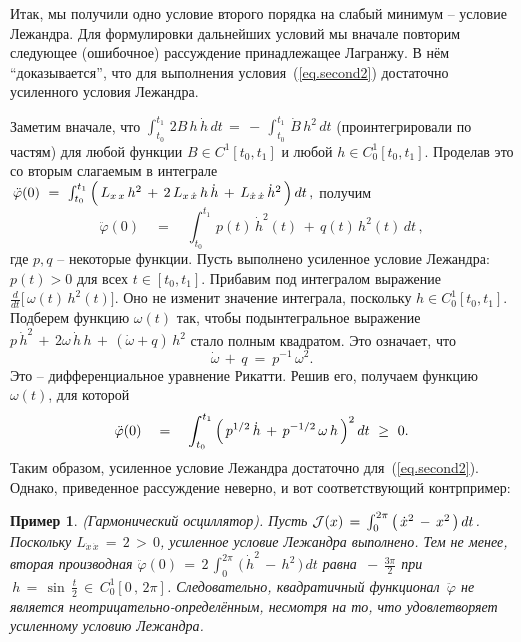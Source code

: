 \documentclass[12pt,a4paper]{article}
\newtheorem{ex}{Пример}
\newcommand{\cJ}{{\cal{J}}}
\begin{document}
Итак, мы получили одно условие второго порядка на слабый минимум
-- условие Лежандра. Для формулировки  дальнейших условий мы
вначале повторим следующее (ошибочное) рассуждение принадлежащее
Лагранжу. В нём ``доказывается'', что для выполнения
условия~(\ref{eq.second2}) достаточно усиленного  условия Лежандра.

Заметим вначале, что $\int_{t_0}^{t_1}\, 2B\, h \, \dot h \, d t
\, = \, -\, \int_{t_0}^{t_1}\, \dot B \, { h}^2 \, d t$
(проинтегрировали по частям) для любой функции $B\in C^1[t_0,
t_1]$ и любой $h \in C_0^1[t_0, t_1]$. Проделав это со вторым
слагаемым в интеграле $\, \ddot \varphi(0)\ = \ \int_{t_0}^{t_1}\,
\Bigl( \, L_{x\, x}\, { h}^2\, + \, 2\, L_{ x\, \dot x}\, h\,
{\dot h}\, +\, L_{\dot x\, \dot x}\, {\dot h}^2   \, \Bigr)\, d
t\, , $ получим
$$
\ddot \varphi(0)\quad = \quad \int_{t_0}^{t_1} \, p(t)\, {\dot
h}^2(t)\, +\, q(t)\, h^2(t)\, d  t\, ,
$$
где $p, q$ -- некоторые функции. Пусть выполнено усиленное условие
Лежандра: $p(t)>0$ для всех $t \in [t_0, t_1]$. Прибавим под
интегралом выражение $\frac{d}{dt}\bigl[\, \omega(t)\, h^2(t)
\bigr]$. Оно не изменит значение интеграла, поскольку $h \in
C^1_0[t_0, t_1]$. Подберем функцию $\omega(t)$ так, чтобы
подынтегральное выражение $p\, {\dot h}^2 \, + \, 2\omega \, \dot
h \, h \, + \, (\dot \omega + q)\, h^2$ стало полным квадратом.
Это означает, что
\begin{equation}\label{eq.rikatti1}
\dot \omega \, + \, q \ = \ p^{-1}\, \omega^2.
\end{equation}
Это -- дифференциальное уравнение Рикатти. Решив его, получаем функцию $\omega (t)$, для которой 
\begin{equation}\label{eq.result-rikatti1}
\ddot \varphi(0) \quad = \quad \int_{t_0}^{t_1} \,  \Bigl(\,
p^{1/2}\, \dot h\, + \, p^{-1/2}\, \omega \, h\,  \Bigr)^2 \, d t
\ \ge \ 0.
\end{equation}
Таким образом, усиленное условие Лежандра достаточно для~(\ref{eq.second2}). Однако, приведенное рассуждение
неверно, и вот соответствующий контрпример:
\begin{ex}\label{ex.oscyl1}(Гармонический осциллятор).
{\em Пусть $\cJ (x)\, = \, \int_{0}^{2\pi}\, \bigl( \, {\dot x}^2
\, - \, x^2\, \bigr)\, d t$. Поскольку $L_{\dot x \, \dot x}\, =
\, 2 \, > \, 0$, усиленное условие Лежандра выполнено. Тем не
менее, вторая производная $\ddot \varphi(0)\, = \, 2\,
\int_{0}^{2\pi}\, \bigl( \, {\dot h}^2 \, - \, h^2\, \bigr)\, d t$
равна $\, - \, \frac{3\pi}{2}$ при $\, h \, = \, \sin \,
\frac{t}{2}\, \in \, C^{1}_0[0\, , \, 2\pi]$. Следовательно,
квадратичный  функционал~$\ddot \varphi$ не является
неотрицательно-определённым, несмотря на то, что  удовлетворяет
усиленному условию Лежандра.
 }
\end{ex}
\end{document}
